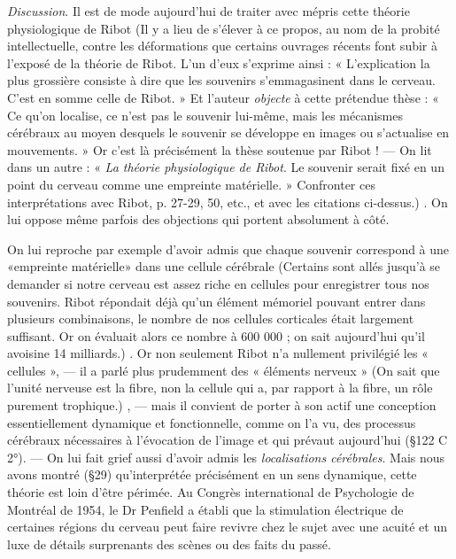 {\it Discussion}. Il est de mode aujourd’hui de traiter avec mépris cette
théorie physiologique de Ribot
{\scriptsize (Il y a lieu de s'élever à ce propos, au nom de la probité intellectuelle, contre les
déformations que certains ouvrages récents font subir à l'exposé de la théorie de Ribot.
L'un d'eux s'exprime ainsi : « L'explication la plus grossière consiste à dire que les
souvenirs s'emmagasinent dans le cerveau. C'est en somme celle de Ribot. » Et l’auteur
{\it objecte} à cette prétendue thèse : « Ce qu’on localise, ce n’est pas le souvenir lui-même,
mais les mécanismes cérébraux au moyen desquels le souvenir se développe en images
ou s’actualise en mouvements. » Or c'est là précisément la thèse soutenue par Ribot !
— On lit dans un autre : « {\it La théorie physiologique de Ribot}. Le souvenir serait fixé en
un point du cerveau comme une empreinte matérielle. » Confronter ces interprétations
avec Ribot, p. 27-29, 50, etc., et avec les citations ci-dessus.)}
. On lui oppose même parfois des
objections qui portent absolument à côté.

\vspace{0.24cm}
{\footnotesize 
On lui reproche par exemple d’avoir admis que chaque souvenir correspond
à une «empreinte matérielle» dans une cellule cérébrale
{\scriptsize (Certains sont allés jusqu'à se demander si notre cerveau est assez riche en cellules
pour enregistrer tous nos souvenirs. Ribot répondait déjà qu'un élément mémoriel
pouvant entrer dans plusieurs combinaisons, le nombre de nos cellules corticales était
largement suffisant. Or on évaluait alors ce nombre à 600 000 ; on sait aujourd'hui
qu'il avoisine 14 milliards.)}
. Or non
seulement Ribot n’a nullement privilégié les « cellules », — il a parlé plus
prudemment des « éléments nerveux »
{\scriptsize (On sait que l'unité nerveuse est la fibre, non la cellule qui a, par rapport à la fibre,
un rôle purement trophique.)}
, — mais il convient de porter à
son actif une conception essentiellement {\it }dynamique et {\it }fonctionnelle, comme
on l’a vu, des processus cérébraux nécessaires à l'évocation de l’image et
qui prévaut aujourd'hui (\S 122 C 2°). — On lui fait grief aussi d'avoir
admis les {\it localisations cérébrales}. Mais nous avons montré (\S 29) qu'interprétée
précisément en un sens dynamique, cette théorie est loin d'être
périmée. Au Congrès international de Psychologie de Montréal de 1954,
le Dr Penfield a établi que la stimulation électrique de certaines régions
du cerveau peut faire revivre chez le sujet avec une acuité et un luxe de
détails surprenants des scènes ou des faits du passé.}
\vspace{0.31cm}

